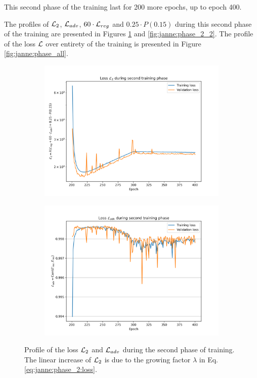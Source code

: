 \documentclass[../main.tex]{subfiles}
\begin{document}
This second phase of the training last for 200 more epochs, up to epoch 400.

The profiles of ${\cal L}_2$, ${\cal L}_{adv}$, $60 \cdot {\cal L}_{reg}$ and $0.25 \cdot P(0.15)$ during this second phase of the training are presented in Figures \ref{fig:janne:phase_2_1} and \ref{fig:janne:phase_2_2}. The profile of the loss ${\cal L}$ over entirety of the training is presented in Figure \ref{fig:janne:phase_all}.

\begin{figure}[ht]
  \centering
  \begin{subfigure}[t]{0.48\linewidth}
    \includegraphics[width=\linewidth]{images/janne/training/phase_2_loss.png}
  \end{subfigure}
  \hfill
  \begin{subfigure}[t]{0.48\linewidth}
    \includegraphics[width=\linewidth]{images/janne/training/phase_2_loss_adv.png}
  \end{subfigure}
  \caption{Profile of the loss ${\cal L}_2$ and ${\cal L}_{adv}$ during the second phase of training. The linear increase of ${\cal L}_2$ is due to the growing factor $\lambda$ in Eq. \ref{eq:janne:phase_2:loss}.}
  \label{fig:janne:phase_2_1}
\end{figure}
\end{document}
